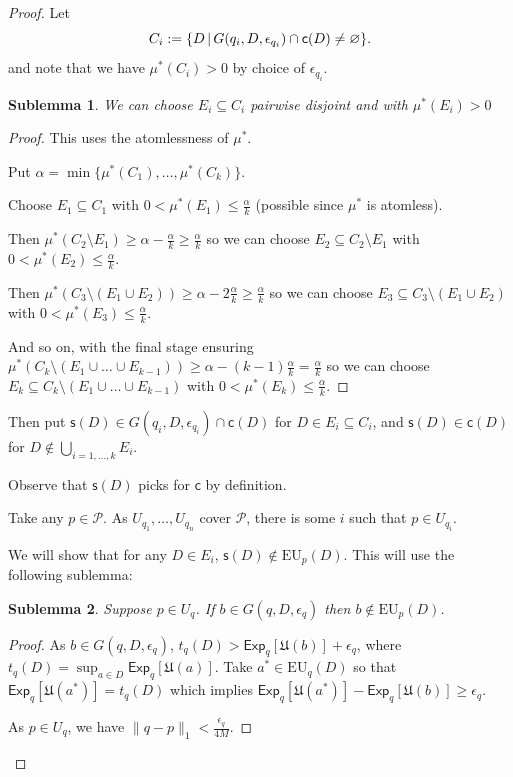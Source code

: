 \documentclass[a4paper,final]{article}
\newtheorem{sublemma}{Sublemma}[theorem]
\newcommand\Prob{\mathcal{P}} %
\newcommand\Exp{\mathsf{Exp}}
\newcommand\EU{\mathrm{EU}}
\newcommand\U{\mathfrak{U}} %
\newcommand\s{\mathsf{s}}
\renewcommand\c{\mathsf{c}} %
\renewcommand{\color}[1]{}
\newenvironment{colored}[1]{\leavevmode\color{#1}}{}
\newcommand\SetDelimiter[1][]{
	\nonscript\,#1\vert \allowbreak \nonscript\,\mathopen{}}
\providecommand\given{\SetDelimiter}
\renewcommand{\emptyset}{\varnothing}
\renewcommand{\leq}{\leqslant}
\renewcommand{\geq}{\geqslant}
\newenvironment{CCM rewritten}
{\begingroup\color{blue}} %
{\endgroup}              %
\begin{document}
\begin{colored}{blue}
\begin{proof}
	Let $$C_i:=\{D\given G(q_i,D,\epsilon_{q_i})\cap \c(D)\neq\emptyset\}.$$
	and note that we have $\mu^*(C_i)>0$ by choice of $\epsilon_{q_i}$.
	\begin{sublemma}
		We can choose $E_i\subseteq C_i$ pairwise disjoint and with $\mu^*(E_i)>0$
	\end{sublemma}
	\begin{proof}
		This uses the atomlessness of  $\mu^*$.
		
		Put $\alpha=\min\{\mu^*(C_1),\ldots,\mu^*(C_k)\}$. 
		
		Choose $E_1\subseteq C_1$ with $0<\mu^*(E_1)\leq \frac{\alpha}{k}$ (possible since $\mu^*$ is atomless). 
		
		Then $\mu^*(C_2\setminus E_1)\geq\alpha-\frac{\alpha}{k}\geq\frac{\alpha}{k}$ so we can choose $E_2\subseteq C_2\setminus E_1$ with $0<\mu^*(E_2)\leq\frac{\alpha}{k}$. 
		
		Then $\mu^*(C_3\setminus(E_1\cup E_2))\geq\alpha-2\frac{\alpha}{k}\geq \frac{\alpha}{k}$ so we can choose $E_3\subseteq C_3\setminus (E_1\cup E_2)$ with $0<\mu^*(E_3)\leq\frac{\alpha}{k}$. 
		
		And so on, with the final stage ensuring $\mu^*(C_k\setminus(E_1\cup\ldots\cup E_{k-1}))\geq\alpha-(k-1)\frac{\alpha}{k}=\frac{\alpha}{k}$ so we can choose $E_k\subseteq C_k\setminus (E_1\cup \ldots\cup E_{k-1})$ with $0<\mu^*(E_k)\leq\frac{\alpha}{k}$.  
	\end{proof}
	
	Then put $\s(D)\in G(q_i,D,\epsilon_{q_i})\cap\c(D)$ for $D\in E_i\subseteq C_i$, and $\s(D)\in \c(D)$ for $D\notin\bigcup_{i=1,\ldots,k} E_i$. 
	
	Observe that $\s(D)$ picks for $\c$ by definition. 
	
	Take any $p\in\Prob$. 
	As $U_{q_1},\ldots, U_{q_n}$ cover $\Prob$, there is some $i$ such that $p\in U_{q_i}$. 
	
	We will show that for any $D\in E_i$, $\s(D)\notin\EU_p(D)$. This will use the following sublemma:
		\begin{sublemma}
		Suppose $p\in U_q$. If $b\in G(q,D,\epsilon_q)$ then $b\notin\EU_p(D)$.
	\end{sublemma}
	\begin{proof} As $b\in G(q,D,\epsilon_q)$,  $t_q(D)>\Exp_q[\U(b)]+\epsilon_q$, where $t_q(D)=\sup_{a \in D}\Exp_q[\U(a)]$. Take $a^*\in \EU_q(D)$ so that $\Exp_q[\U(a^*)]=t_q(D)$ which implies $\Exp_q[\U(a^*)]-\Exp_q[\U(b)]\geq \epsilon_q$. 
		
		As  $p\in U_q$, we have $\|q-p\|_1<\frac{\epsilon_q}{4M}$.
		

\end{proof}
\end{proof}
\end{colored}
\end{document}
